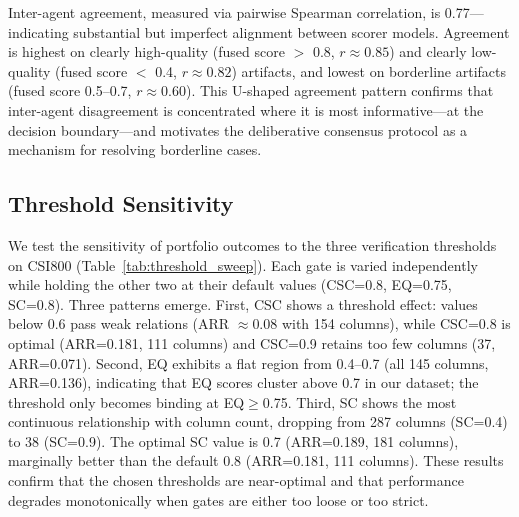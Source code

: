 \documentclass[sigconf]{acmart}
\begin{document}
Inter-agent agreement, measured via pairwise Spearman correlation, is 0.77---indicating substantial but imperfect alignment between scorer models. Agreement is highest on clearly high-quality (fused score $>$ 0.8, $r \approx 0.85$) and clearly low-quality (fused score $<$ 0.4, $r \approx 0.82$) artifacts, and lowest on borderline artifacts (fused score 0.5--0.7, $r \approx 0.60$). This U-shaped agreement pattern confirms that inter-agent disagreement is concentrated where it is most informative---at the decision boundary---and motivates the deliberative consensus protocol as a mechanism for resolving borderline cases.

\subsection{Threshold Sensitivity}

We test the sensitivity of portfolio outcomes to the three verification thresholds on CSI800 (Table~\ref{tab:threshold_sweep}). Each gate is varied independently while holding the other two at their default values (CSC=0.8, EQ=0.75, SC=0.8). Three patterns emerge. First, CSC shows a threshold effect: values below 0.6 pass weak relations (ARR $\approx$0.08 with 154 columns), while CSC=0.8 is optimal (ARR=0.181, 111 columns) and CSC=0.9 retains too few columns (37, ARR=0.071). Second, EQ exhibits a flat region from 0.4--0.7 (all 145 columns, ARR=0.136), indicating that EQ scores cluster above 0.7 in our dataset; the threshold only becomes binding at EQ$\geq$0.75. Third, SC shows the most continuous relationship with column count, dropping from 287 columns (SC=0.4) to 38 (SC=0.9). The optimal SC value is 0.7 (ARR=0.189, 181 columns), marginally better than the default 0.8 (ARR=0.181, 111 columns). These results confirm that the chosen thresholds are near-optimal and that performance degrades monotonically when gates are either too loose or too strict.
\end{document}
